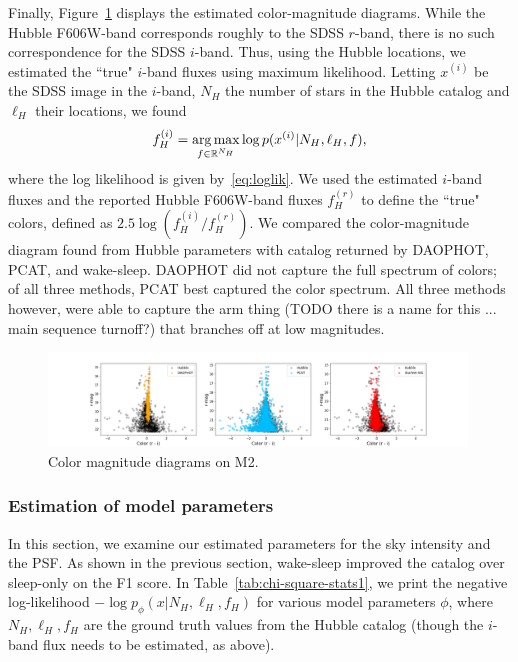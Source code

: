 Finally, Figure~\ref{fig:cmd_m2} displays the estimated color-magnitude diagrams. While the Hubble F606W-band corresponds roughly to the SDSS $r$-band, there is no such correspondence for the SDSS $i$-band. Thus, using the Hubble locations, we estimated the ``true" $i$-band fluxes using maximum likelihood. Letting $x^{(i)}$ be the SDSS image in the $i$-band, $N_H$ the number of stars in the Hubble catalog and $\ell_H$ their locations, we found  
\begin{align}
   f^{(i)}_H = \operatorname*{arg\,max}_{f\in\mathbb{R}^{N_H}} \log p(x^{(i)} | N_H, \ell_H, f)
   \label{eq:optim_iband_flux},
\end{align}
where the log likelihood is given by~\eqref{eq:loglik}. We used the estimated $i$-band fluxes and the reported Hubble F606W-band fluxes $f_H^{(r)}$ to define the ``true" colors, defined as $2.5\log(f_H^{(i)}/f_H^{(r)})$. We compared
the color-magnitude diagram found from Hubble parameters with catalog returned by DAOPHOT, PCAT, and wake-sleep. DAOPHOT did not capture the full spectrum of colors; of all three methods, PCAT best captured the color spectrum. All three methods however, were able to capture the arm thing (TODO there is a name for this ... main sequence turnoff?) that branches off at low magnitudes. 

\begin{figure}[ht]
    \centering
    \includegraphics[width=0.99\textwidth]{figures/cmd.png}
    \caption{Color magnitude diagrams on M2. }
    \label{fig:cmd_m2}
\end{figure}


\subsubsection{Estimation of model parameters}
\label{sec:results_model_params}
In this section, we examine our estimated parameters 
for the sky intensity and the PSF. As shown in the previous section, wake-sleep improved the catalog over sleep-only on the F1 score. In Table~\ref{tab:chi-square-stats1}, we
print the negative log-likelihood $- \log p_\phi(x | N_{H}, \ell_{H}, f_{H})$ for various model parameters $\phi$, where $N_{H}, \ell_{H}, f_{H}$ are the ground truth
values from the Hubble catalog (though the $i$-band flux needs to be estimated, as above). 

